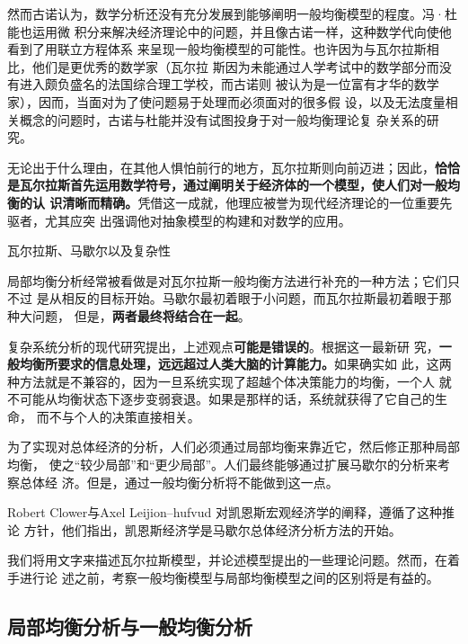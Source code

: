然而古诺认为，数学分析还没有充分发展到能够阐明一般均衡模型的程度。冯·杜能也运用微
积分来解决经济理论中的问题，并且像古诺一样，这种数学代向使他看到了用联立方程体系
来呈现一般均衡模型的可能性。也许因为与瓦尔拉斯相比，他们是更优秀的数学家（瓦尔拉
斯因为未能通过人学考试中的数学部分而没有进入颇负盛名的法国综合理工学校，而古诺则
被认为是一位富有才华的数学家），因而，当面对为了使问题易于处理而必须面对的很多假
设，以及无法度量相关概念的问题时，古诺与杜能并没有试图投身于对一般均衡理论复
杂关系的研究。

无论出于什么理由，在其他人惧怕前行的地方，瓦尔拉斯则向前迈进；因此，\textbf{恰恰
  是瓦尔拉斯首先运用数学符号，通过阐明关于经济体的一个模型，使人们对一般均衡的认
  识清晰而精确。}凭借这一成就，他理应被誉为现代经济理论的一位重要先驱者，尤其应突
出强调他对抽象模型的构建和对数学的应用。

\begin{mybox}{瓦尔拉斯、马歇尔以及复杂性}
  \begin{multicols}{2}
    局部均衡分析经常被看做是对瓦尔拉斯一般均衡方法进行补充的一种方法；它们只不过
    是从相反的目标开始。马歇尔最初着眼于小问题，而瓦尔拉斯最初着眼于那种大问题，
    但是，\textbf{两者最终将结合在一起}。

    复杂系统分析的现代研究提出，上述观点\textbf{可能是错误的}。根据这一最新研
    究，\textbf{一般均衡所要求的信息处理，远远超过人类大脑的计算能力。}如果确实如
    此，这两种方法就是不兼容的，因为一旦系统实现了超越个体决策能力的均衡，一个人
    就不可能从均衡状态下逐步变弱衰退。如果是那样的话，系统就获得了它自己的生命，
    而不与个人的决策直接相关。

    为了实现对总体经济的分析，人们必须通过局部均衡来靠近它，然后修正那种局部均衡，
    使之“较少局部”和“更少局部”。人们最终能够通过扩展马歇尔的分析来考察总体经
    济。但是，通过一般均衡分析将不能做到这一点。

    Robert Clower与Axel Leijion--hufvud 对凯恩斯宏观经济学的阐释，遵循了这种推论
    方针，他们指出，凯恩斯经济学是马歇尔总体经济分析方法的开始。
  \end{multicols}
\end{mybox}

我们将用文字来描述瓦尔拉斯模型，并论述模型提出的一些理论问题。然而，在着手进行论
述之前，考察一般均衡模型与局部均衡模型之间的区别将是有益的。


\subsection{局部均衡分析与一般均衡分析}

